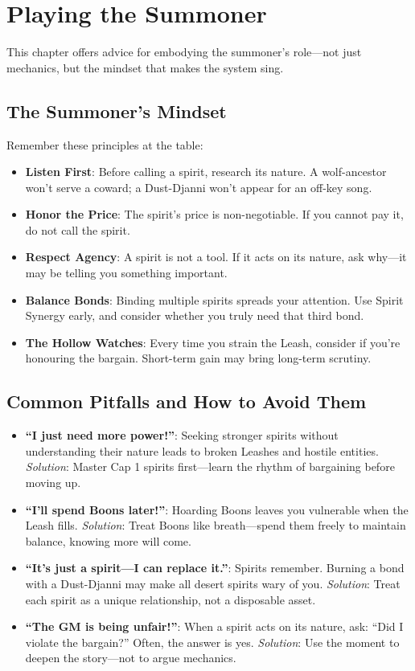 \documentclass[11pt,twoside]{book}
\begin{document}
\chapter{Playing the Summoner}
This chapter offers advice for embodying the summoner's role---not just mechanics, but the mindset that makes the system sing.

\section{The Summoner's Mindset}
Remember these principles at the table:
\begin{itemize}
  \item \textbf{Listen First}: Before calling a spirit, research its nature. A wolf-ancestor won't serve a coward; a Dust-Djanni won't appear for an off-key song.
  \item \textbf{Honor the Price}: The spirit's price is non-negotiable. If you cannot pay it, do not call the spirit.
  \item \textbf{Respect Agency}: A spirit is not a tool. If it acts on its nature, ask why---it may be telling you something important.
  \item \textbf{Balance Bonds}: Binding multiple spirits spreads your attention. Use Spirit Synergy early, and consider whether you truly need that third bond.
  \item \textbf{The Hollow Watches}: Every time you strain the Leash, consider if you're honouring the bargain. Short-term gain may bring long-term scrutiny.
\end{itemize}

\section{Common Pitfalls and How to Avoid Them}
\begin{itemize}
  \item \textbf{``I just need more power!''}: Seeking stronger spirits without understanding their nature leads to broken Leashes and hostile entities. \textit{Solution}: Master Cap 1 spirits first---learn the rhythm of bargaining before moving up.
  \item \textbf{``I'll spend Boons later!''}: Hoarding Boons leaves you vulnerable when the Leash fills. \textit{Solution}: Treat Boons like breath---spend them freely to maintain balance, knowing more will come.
  \item \textbf{``It's just a spirit---I can replace it.''}: Spirits remember. Burning a bond with a Dust-Djanni may make all desert spirits wary of you. \textit{Solution}: Treat each spirit as a unique relationship, not a disposable asset.
  \item \textbf{``The GM is being unfair!''}: When a spirit acts on its nature, ask: ``Did I violate the bargain?'' Often, the answer is yes. \textit{Solution}: Use the moment to deepen the story---not to argue mechanics.
\end{itemize}
\end{document}
